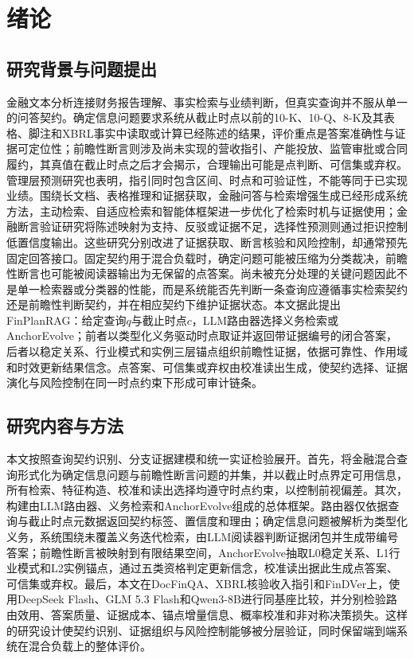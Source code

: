 \chapter{绪论}
\label{ch:intro}

\section{研究背景与问题提出}

金融文本分析连接财务报告理解、事实检索与业绩判断，但真实查询并不服从单一的问答契约。确定信息问题要求系统从截止时点以前的10-K、10-Q、8-K及其表格、脚注和XBRL事实中读取或计算已经陈述的结果，评价重点是答案准确性与证据可定位性；前瞻性断言则涉及尚未实现的营收指引、产能投放、监管审批或合同履约，其真值在截止时点之后才会揭示，合理输出可能是点判断、可信集或弃权。管理层预测研究也表明，指引同时包含区间、时点和可验证性，不能等同于已实现业绩\citep{hirst2008management}。围绕长文档、表格推理和证据获取，金融问答与检索增强生成已经形成系统方法\citep{lewis2020rag,chen2021finqa,zhu2021tatqa,islam2023financebench,reddy2024docfinqa}，主动检索、自适应检索和智能体框架进一步优化了检索时机与证据使用\citep{jiang2023flare,jeong2024adaptiverag,yao2023react,shinn2023reflexion}；金融断言验证研究将陈述映射为支持、反驳或证据不足\citep{zhao2024findver,rangapur2025finfact}，选择性预测则通过拒识控制低置信度输出\citep{chow1970optimum,geifman2017selective}。这些研究分别改进了证据获取、断言核验和风险控制，却通常预先固定回答接口。固定契约用于混合负载时，确定问题可能被压缩为分类裁决，前瞻性断言也可能被阅读器输出为无保留的点答案。尚未被充分处理的关键问题因此不是单一检索器或分类器的性能，而是系统能否先判断一条查询应遵循事实检索契约还是前瞻性判断契约，并在相应契约下维护证据状态。本文据此提出FinPlanRAG：给定查询$q$与截止时点$c$，LLM路由器选择义务检索或AnchorEvolve；前者以类型化义务驱动时点取证并返回带证据编号的闭合答案，后者以稳定关系、行业模式和实例三层锚点组织前瞻性证据，依据可靠性、作用域和时效更新结果信念。点答案、可信集或弃权由校准读出生成，使契约选择、证据演化与风险控制在同一时点约束下形成可审计链条。

\section{研究内容与方法}

本文按照查询契约识别、分支证据建模和统一实证检验展开。首先，将金融混合查询形式化为确定信息问题与前瞻性断言问题的并集，并以截止时点界定可用信息，所有检索、特征构造、校准和读出选择均遵守时点约束，以控制前视偏差\citep{lopezdeprado2018advances}。其次，构建由LLM路由器、义务检索和AnchorEvolve组成的总体框架。路由器仅依据查询与截止时点元数据返回契约标签、置信度和理由；确定信息问题被解析为类型化义务，系统围绕未覆盖义务迭代检索，由LLM阅读器判断证据闭包并生成带编号答案；前瞻性断言被映射到有限结果空间，AnchorEvolve抽取L0稳定关系、L1行业模式和L2实例锚点，通过五类资格判定更新信念，校准读出据此生成点答案、可信集或弃权。最后，本文在DocFinQA、XBRL核验收入指引和FinDVer上，使用DeepSeek Flash、GLM 5.3 Flash和Qwen3-8B进行同基座比较，并分别检验路由效用、答案质量、证据成本、锚点增量信息、概率校准和非对称决策损失。这样的研究设计使契约识别、证据组织与风险控制能够被分层验证，同时保留端到端系统在混合负载上的整体评价。

